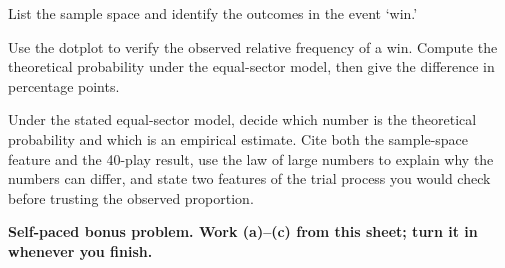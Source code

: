 \documentclass[14pt]{extarticle}
\begin{document}
\begin{description}[leftmargin=1.15in, labelwidth=1in, itemsep=2pt, topsep=2pt]
  \item[\dokbadge{1}~(a)] List the sample space and identify the outcomes in the event `win.'
  \item[\dokbadge{2}~(b)] Use the dotplot to verify the observed relative frequency of a win. Compute the theoretical probability under the equal-sector model, then give the difference in percentage points.
  \item[\dokbadge{3}~(c)] Under the stated equal-sector model, decide which number is the theoretical probability and which is an empirical estimate. Cite both the sample-space feature and the 40-play result, use the law of large numbers to explain why the numbers can differ, and state two features of the trial process you would check before trusting the observed proportion.
\end{description}

\vfill
\textbf{Self-paced bonus problem. Work (a)--(c) from this sheet; turn it in whenever you finish.}
\end{document}
